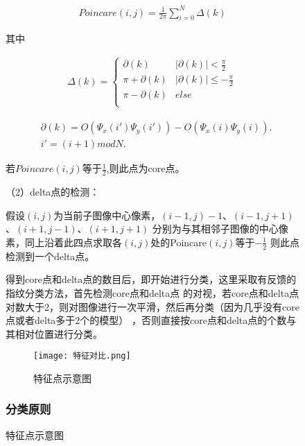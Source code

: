 \documentclass{whutmod}
\begin{document}
\begin{spacing}{1.2}
\begin{figure}[H]
\begin{equation}
	\label{3.3}
	\begin{split}
       Poincare(i,j)=\frac{1}{2\pi}\sum_{i=0}^N\Delta(k)
	\end{split}
\end{equation}

其中

\begin{equation}
	\label{3.3}
	\begin{split}
		\Delta(k)=\begin{cases}
			\partial(k)& \lvert \partial(k)\rvert < \frac{\pi}{2}\\
			\pi+\partial(k)& \lvert \partial(k)\rvert \le -\frac{\pi}{2}\\
			\pi-\partial(k)&else\\
		\end{cases}
	\end{split}
\end{equation}


\begin{equation}
	\label{3.4}
	\begin{split}
		&\partial(k)=O(\Psi_x(i')\Psi_y(i'))-O(\Psi_x(i)\Psi_y(i)).\\
		&i'=(i+1)modN.
	\end{split}
\end{equation}

若$Poincare(i,j)$等于$\frac{1}{2}$,则此点为core点。

（2）delta点的检测：

假设$(i,j)$为当前子图像中心像素，$(i-1,j)-1$、$(i-1,j+1)$、$(i+1,j-1)$、$(i+1,j+1)$
分别为与其相邻子图像的中心像素，同上沿着此四点求取各$(i,j)$处的Poincare$(i,j)$等于$-\frac{1}{2}$
则此点检测到一个delta点。

得到core点和delta点的数目后，即开始进行分类，这里采取有反馈的指纹分类方法，首先检测core点和delta点
的对视，若core点和delta点对数大于2，则对图像进行一次平滑，然后再分类（因为几乎没有core点或者delta多于2个的模型）
，否则直接按core点和delta点的个数与其相对位置进行分类。

\begin{figure}[H]
	\centering
	\texttt{[image: 特征对比.png]}
	\caption{特征点示意图}
	\label{纹型判断}
\end{figure}


\subsubsection{分类原则}


\end{figure}
\end{spacing}
\end{document}

